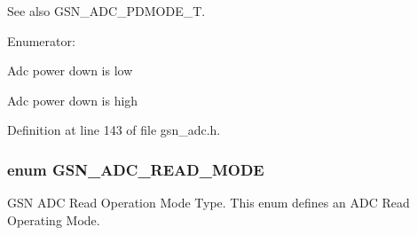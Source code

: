 \begin{DoxySeeAlso}{See also}
GSN\_\-ADC\_\-PDMODE\_\-T. 
\end{DoxySeeAlso}
\begin{Desc}
\item[Enumerator: ]\par
\begin{description}
\item[{\em 
\hypertarget{a00643_gga16deea942d0f1d07a971516149233bb4a4c93f28c10b8dac170fba58a41df9699}{
GSN\_\-ADC\_\-PDPOLARITY\_\-L}
\label{a00643_gga16deea942d0f1d07a971516149233bb4a4c93f28c10b8dac170fba58a41df9699}
}]Adc power down is low \item[{\em 
\hypertarget{a00643_gga16deea942d0f1d07a971516149233bb4a4b2e65383baf79d5342d80ad2deeb622}{
GSN\_\-ADC\_\-PDPOLARITY\_\-H}
\label{a00643_gga16deea942d0f1d07a971516149233bb4a4b2e65383baf79d5342d80ad2deeb622}
}]Adc power down is high \end{description}
\end{Desc}



Definition at line 143 of file gsn\_\-adc.h.

\hypertarget{a00643_ga99061f6e0169c89e57e4cd5d5ce1596c}{
\subsubsection[{GSN\_\-ADC\_\-READ\_\-MODE}]{\setlength{\rightskip}{0pt plus 5cm}enum {\bf GSN\_\-ADC\_\-READ\_\-MODE}}}
\label{a00643_ga99061f6e0169c89e57e4cd5d5ce1596c}


GSN ADC Read Operation Mode Type. This enum defines an ADC Read Operating Mode. 

